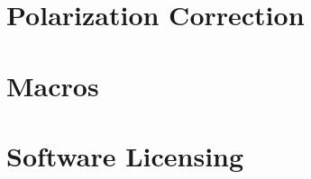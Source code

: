 \documentclass[12pt]{book}
\begin{document}
\chapter{Polarization Correction}


\chapter{Macros}


\chapter{Software Licensing}



 

\printindex
\end{document}
